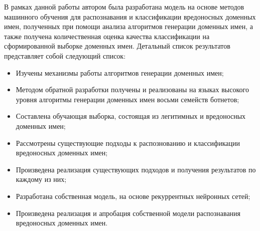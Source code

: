 В рамках данной работы автором была разработана модель на основе методов машинного обучения для распознавания и классификации вредоносных доменных имен, полученных при помощи анализа алгоритмов генерации доменных имен, а также получена количественная оценка качества классификации на сформированной выборке доменных имен. Детальный список результатов представляет собой следующий список:
\begin{itemize}
\item Изучены механизмы работы алгоритмов генерации доменных имен;
\item Методом обратной разработки получены и реализованы на языках высокого уровня алгоритмы генерации доменных имен восьми семейств ботнетов;
\item Составлена обучающая выборка, состоящая из легитимных и вредоносных доменных имен;
\item Рассмотрены существующие подходы к распознованию и классификации вредоносных доменных имен;
\item Произведена реализация существующих подходов и получения результатов по каждому из них;
\item Разработана собственная модель, на основе рекуррентных нейронных сетей;
\item Произведена реализация и апробация собственной модели распознавания вредоносных доменных имен.
\end{itemize}
\clearpage